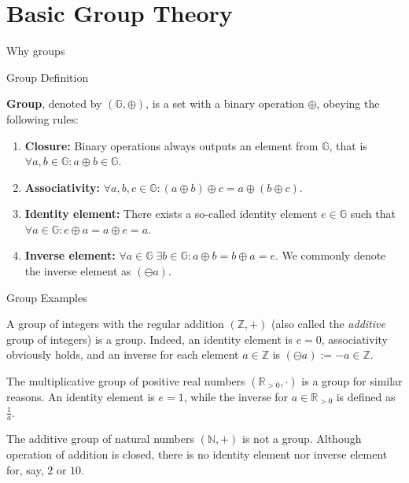 \documentclass{beamer}
\begin{document}
    \section{Basic Group Theory}

    \begin{frame}{Why groups}

    \end{frame}

    \begin{frame}{Group Definition}
      \begin{definition}
        \textbf{Group}, denoted by $(\mathbb{G}, \oplus)$, is a set with a binary operation $\oplus$, obeying the following rules:
        \begin{enumerate}
            \item \textbf{Closure:} Binary operations always outputs an element from $\mathbb{G}$, that is $\forall a,b \in \mathbb{G}: a \oplus b \in \mathbb{G}$.
            \item \textbf{Associativity:} $\forall a,b,c \in \mathbb{G}: (a \oplus b)\oplus c = a \oplus (b \oplus c)$.
            \item \textbf{Identity element:} There exists a so-called identity element $e \in \mathbb{G}$ such that $\forall a \in \mathbb{G}: e \oplus a = a \oplus e = a$.
            \item \textbf{Inverse element:} $\forall a \in \mathbb{G} \; \exists b \in \mathbb{G}: a\oplus b = b \oplus a = e$. We commonly denote the inverse element as $(\ominus a)$.
        \end{enumerate}
    \end{definition}
    \end{frame}

    \begin{frame}{Group Examples}
      \begin{example}
        A group of integers with the regular addition $(\mathbb{Z},+)$ (also called the \textit{additive} group of integers) is a group. Indeed, an identity element is $e=0$, associativity obviously holds, and an inverse for each element $a \in \mathbb{Z}$ is $(\ominus a) := -a \in \mathbb{Z}$. 
      \end{example}
      
      \begin{example}
          The multiplicative group of positive real numbers $(\mathbb{R}_{> 0}, \cdot)$ is a group for similar reasons. An identity element is $e = 1$, while the inverse for $a \in \mathbb{R}_{>0}$ is defined as $\frac{1}{a}$.
      \end{example}
      
      \begin{example}
          The additive group of natural numbers $(\mathbb{N}, +)$ is not a group. Although operation of addition is closed, there is no identity element nor inverse element for, say, $2$ or $10$.
      \end{example}
    \end{frame}
\end{document}
